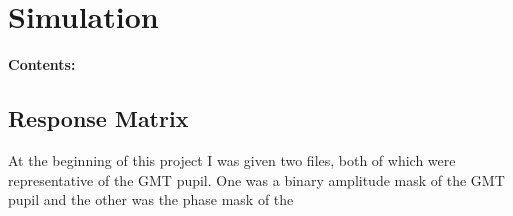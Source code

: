 
\chapter{Simulation} %

\noindent\textbf{\large Contents:}

\noindent\hrulefill
\noindent\startcontents[chapters]
\noindent{}
\noindent\hrulefill

\label{Chapter2} %




\section{Response Matrix}

At the beginning of this project I was given two files, both of which were representative of the GMT pupil.  One was a binary amplitude mask of the GMT pupil and the other was the phase mask of the 

